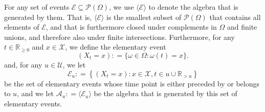 \documentclass[10pt,a4paper]{paper}
\theoremstyle{definition}
\newcommand{\nats}{\mathbb{N}}
\newcommand{\reals}{\mathbb{R}}
\newcommand{\realsnonneg}{\reals_{\geq 0}}
\newcommand{\states}{\mathcal{X}}
\newcommand{\paths}{\Omega}
\newcommand{\power}{\mathcal{P}(\paths)}
\newcommand{\nonemptypower}{\power_{\emptyset}}
\newcommand{\events}{\mathcal{E}}
\newcommand{\filter}[1][t]{\mathcal{F}_{#1}}
\newcommand{\coloneqq}{:\!=}
\begin{document}
For any set of events $\mathcal{E}\subseteq\power$, we use $\langle\mathcal{E}\rangle$ to denote the algebra that is generated by them. That is, $\langle\mathcal{E}\rangle$ is the smallest subset of $\power$ that contains all elements of $\mathcal{E}$, and that is furthermore closed under complements in $\Omega$ and finite unions, and therefore also under finite intersections. 
Furthermore, for any $t\in\realsnonneg$ and $x\in\states$, we define the elementary event
\begin{equation*}
(X_t=x)\coloneqq\{\omega\in\paths\colon\omega(t)=x\}.
\end{equation*}
%
%
and, for any $u\in\mathcal{U}$, we let
\begin{equation*}
\mathcal{E}_u \coloneqq \left\{
(X_t=x)
\colon
x\in\states,t\in u\cup\reals_{>u}
\right\}
\end{equation*}
be the set of elementary events whose time point is either preceded by or belongs to $u$, and we let $\mathcal{A}_u\coloneqq\langle\mathcal{E}_u\rangle$ be the algebra that is generated by this set of elementary events. 
\end{document}
